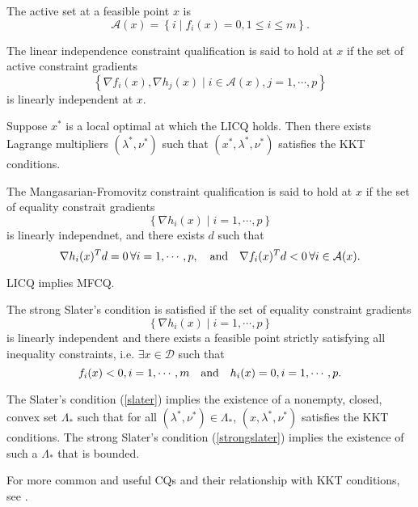 \documentclass[12pt]{article}
\begin{document}
\begin{definition}
    The \textnormal{active set} at a feasible point \(x\) is
    \[\mathcal A(x)=\left\{i\mid f_i(x)=0,1\leqslant i\leqslant m\right\}.\]
\end{definition}

\begin{definition}[LICQ]
    The \textnormal{linear independence constraint qualification} is said to hold at \(x\) if the set of active constraint gradients
    \[\left\{\nabla f_i(x),\nabla h_j(x)\mid i\in\mathcal A(x),j=1,\cdots,p\right\}\]
    is linearly independent at \(x\).
\end{definition}

\begin{theorem}
    Suppose \(x^\ast\) is a local optimal at which the LICQ holds. Then there exists Lagrange multipliers \(\left(\lambda^\ast,\nu^\ast\right)\) such that \(\left(x^\ast,\lambda^\ast,\nu^\ast\right)\) satisfies the KKT conditions.
\end{theorem}

\begin{definition}[MFCQ]
    The \textnormal{Mangasarian-Fromovitz constraint qualification} is said to hold at \(x\) if the set of equality constrait gradients
    \[\left\{\nabla h_i(x)\mid i=1,\cdots,p\right\}\]
    is linearly independnet, and there exists \(d\) such that
    \[\nabla h_i(x)^Td=0\,\forall i=1,\cdots,p,\quad\textnormal{and}\quad \nabla f_i(x)^Td<0\,\forall i\in\mathcal A(x).\]
\end{definition}

\begin{theorem}
    LICQ implies MFCQ.
\end{theorem}

\begin{definition}\label{strongslater}
    The \textnormal{strong Slater's condition} is satisfied if the set of equality constraint gradients
    \[\left\{\nabla h_i(x)\mid i=1,\cdots,p\right\}\]
    is linearly independent and there exists a feasible point strictly satisfying all inequality constraints, i.e. \(\exists x\in\mathcal D\) such that
    \[f_i(x)<0,i=1,\cdots,m\quad\textnormal{and}\quad h_i(x)=0,i=1,\cdots,p.\]
\end{definition}

\begin{theorem}
    The Slater's condition (\ref{slater}) implies the existence of a nonempty, closed, convex set \(\Lambda_\ast\) such that for all \(\left(\lambda^\ast,\nu^\ast\right)\in\Lambda_\ast\), \(\left(x,\lambda^\ast,\nu^\ast\right)\) satisfies the KKT conditions. The strong Slater's condition (\ref{strongslater}) implies the existence of such a \(\Lambda_\ast\) that is bounded.
\end{theorem}

For more common and useful CQs and their relationship with KKT conditions, see \cite{wachsmuth2013licq}.




\end{document}
